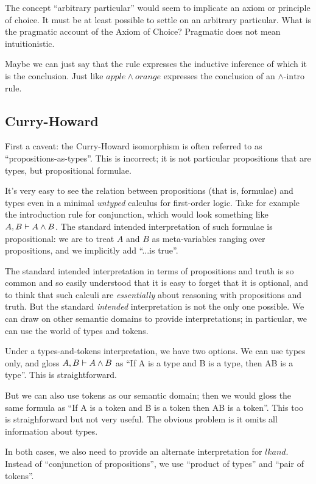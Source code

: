 \documentclass{article}
\begin{document}
The concept ``arbitrary particular'' would seem to implicate an axiom
or principle of choice. It must be at least possible to settle on an
arbitrary particular. What is the pragmatic account of the Axiom of
Choice? Pragmatic does not mean intuitionistic.

Maybe we can just say that the rule
expresses the inductive inference of which it is the conclusion. Just
like \(apple\land orange\) expresses the conclusion of an
\(\land\scriptstyle{\text{-intro}}\) rule.

\subsection{Curry-Howard}

First a caveat: the Curry-Howard isomorphism is often referred to as
``propositions-as-types''. This is incorrect; it is not particular
propositions that are types, but propositional formulae.

It's very easy to see the relation between propositions (that is,
formulae) and types even in a minimal \textit{untyped} calculus for
first-order logic. Take for example the introduction rule for
conjunction, which would look something like \(A, B\vdash A\land B\).
The standard intended interpretation of such formulae is
propositional: we are to treat \(A\) and \(B\) as meta-variables
ranging over propositions, and we implicitly add ``...is true''.

The standard intended interpretation in terms of propositions and
truth is so common and so easily understood that it is easy to forget
that it is optional, and to think that such calculi are
\textit{essentially} about reasoning with propositions and truth. But
the standard \textit{intended} interpretation is not the only one
possible. We can draw on other semantic domains to provide
interpretations; in particular, we can use the world of types and
tokens.

Under a types-and-tokens interpretation, we have two options. We can
use types only, and gloss \(A, B\vdash A\land B\) as ``If A is a type
and B is a type, then A\lkand B is a type''. This is straightforward.

But we can also use tokens as our semantic domain; then we would gloss
the same formula as ``If A is a token and B is a token then A\lkand B
is a token''. This too is straighforward but not very useful. The
obvious problem is it omits all information about types.

In both cases, we also need to provide an alternate interpretation for
\(lkand\). Instead of ``conjunction of propositions'', we use
``product of types'' and ``pair of tokens''.
\end{document}

